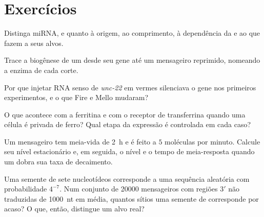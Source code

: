 \section{Exercícios}

\begin{exercise}[$\star$]\label{exo:b3:rna-regulation:1}
Distinga miRNA,  e  quanto à origem, ao comprimento, à
dependência da  e ao que fazem a seus alvos.
\end{exercise}

\begin{exercise}[$\star$]\label{exo:b3:rna-regulation:2}
Trace a biogênese de um  desde seu gene até um mensageiro
reprimido, nomeando a enzima de cada corte.
\end{exercise}

\begin{exercise}[$\star$]\label{exo:b3:rna-regulation:3}
Por que injetar RNA senso de \emph{unc-22} em vermes silenciava o gene
nos primeiros experimentos, e o que Fire e Mello mudaram?
\end{exercise}

\begin{exercise}[$\star$]\label{exo:b3:rna-regulation:4}
O que acontece com a ferritina e com o receptor de transferrina quando
uma célula é privada de ferro? Qual etapa da expressão é controlada em
cada caso?
\end{exercise}

\begin{exercise}[$\star\star$]\label{exo:b3:rna-regulation:5}
Um mensageiro tem meia-vida de \qty{2}{h} e é feito a $5$ moléculas
por minuto. Calcule seu nível estacionário e, em seguida, o nível e o
tempo de meia-resposta quando um  dobra sua taxa de
decaimento.
\end{exercise}

\begin{exercise}[$\star\star$]\label{exo:b3:rna-regulation:6}
Uma semente de sete nucleotídeos corresponde a uma sequência aleatória
com probabilidade $4^{-7}$. Num conjunto de \num{20000} mensageiros
com regiões 3$'$ não traduzidas de \qty{1000}{nt} em média, quantos
sítios uma semente de  corresponde por acaso? O que, então,
distingue um alvo real?
\end{exercise}


